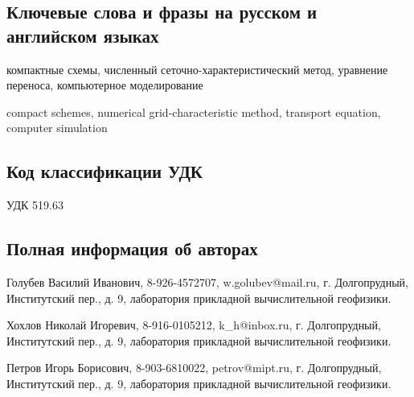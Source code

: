 \documentclass[11pt]{article}
\begin{document}
\subsection {Ключевые слова и фразы на русском и английском языках}

компактные схемы, численный сеточно-характеристический метод, уравнение переноса, компьютерное моделирование

compact schemes, numerical grid-characteristic method, transport equation, computer simulation

\subsection {Код классификации УДК}

УДК 519.63

\subsection {Полная информация об авторах}

Голубев Василий Иванович, 8-926-4572707, w.golubev@mail.ru, г. Долгопрудный, Институтский пер., д. 9, лаборатория прикладной вычислительной геофизики.

Хохлов Николай Игоревич, 8-916-0105212, k\_h@inbox.ru, г. Долгопрудный, Институтский пер., д. 9, лаборатория прикладной вычислительной геофизики.

Петров Игорь Борисович, 8-903-6810022, petrov@mipt.ru, г. Долгопрудный, Институтский пер., д. 9, лаборатория прикладной вычислительной геофизики.
\end{document}
